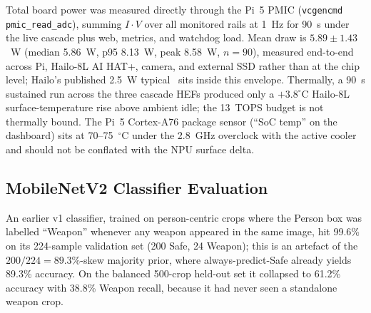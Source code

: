 \documentclass{ieeeaccess}
\begin{document}
Total board power was measured directly through the Pi~5 PMIC (\texttt{vcgencmd pmic\_read\_adc}), summing $I\!\cdot\!V$ over all monitored rails at 1~Hz for 90~s under the live cascade plus web, metrics, and watchdog load. Mean draw is $5.89 \pm 1.43$~W (median 5.86~W, p95 8.13~W, peak 8.58~W, $n=90$), measured end-to-end across Pi, Hailo-8L AI HAT+, camera, and external SSD rather than at the chip level; Hailo's published 2.5~W typical~\cite{b3} sits inside this envelope. Thermally, a 90~s sustained run across the three cascade HEFs produced only a $+3.8^\circ$C Hailo-8L surface-temperature rise above ambient idle; the 13~TOPS budget is not thermally bound. The Pi~5 Cortex-A76 package sensor (``SoC temp'' on the dashboard) sits at 70--75~$^\circ$C under the 2.8~GHz overclock with the active cooler and should not be conflated with the NPU surface delta.

\begin{table}[ht!]
\caption{\textbf{FP32 Baseline and INT8 Deployment on the Same Test Split}}
\label{tab:quant}
\setlength{\tabcolsep}{3pt}
\centering\small
{}
\end{table}


\subsection{MobileNetV2 Classifier Evaluation}
\label{sec:classifier_eval}
An earlier v1 classifier, trained on person-centric crops where the Person box was labelled ``Weapon'' whenever any weapon appeared in the same image, hit 99.6\% on its 224-sample validation set (200 Safe, 24 Weapon); this is an artefact of the $200/224 = 89.3\%$-skew majority prior, where always-predict-Safe already yields 89.3\% accuracy. On the balanced 500-crop held-out set it collapsed to 61.2\% accuracy with 38.8\% Weapon recall, because it had never seen a standalone weapon crop.
\end{document}
